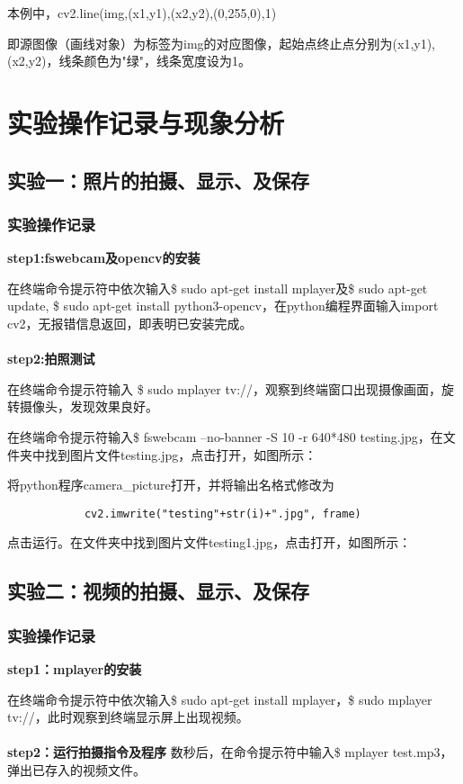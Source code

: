 \documentclass{article}
\begin{document}
本例中，cv2.line(img,(x1,y1),(x2,y2),(0,255,0),1)

即源图像（画线对象）为标签为img的对应图像，起始点终止点分别为(x1,y1),(x2,y2)，线条颜色为"绿"，线条宽度设为1。

\section{实验操作记录与现象分析}
\subsection{实验一：照片的拍摄、显示、及保存}
\subsubsection{实验操作记录}


\textbf{step1:fswebcam及opencv的安装}

在终端命令提示符中依次输入\$ sudo apt-get install mplayer及\$ sudo apt-get update,
\$ sudo apt-get install python3-opencv，在python编程界面输入import cv2，无报错信息返回，即表明已安装完成。
\\ \hspace*{\fill} \\ 
\indent\textbf{step2:拍照测试}

在终端命令提示符输入 \$ sudo mplayer tv://，观察到终端窗口出现摄像画面，旋转摄像头，发现效果良好。

在终端命令提示符输入\$ fswebcam --no-banner -S 10 -r 640*480 testing.jpg，在文件夹中找到图片文件testing.jpg，点击打开，如图所示：



将python程序camera\_picture打开，并将输出名格式修改为
\begin{lstlisting}
            cv2.imwrite("testing"+str(i)+".jpg", frame)
\end{lstlisting}

点击运行。在文件夹中找到图片文件testing1.jpg，点击打开，如图所示：


\subsection{实验二：视频的拍摄、显示、及保存}
\subsubsection{实验操作记录}
\indent\textbf{step1：mplayer的安装}

在终端命令提示符中依次输入\$ sudo apt-get install mplayer，\$ sudo mplayer tv://，此时观察到终端显示屏上出现视频。
\\ \hspace*{\fill}\\
\indent\textbf{step2：运行拍摄指令及程序}
数秒后，在命令提示符中输入\$ mplayer test.mp3，弹出已存入的视频文件。
\end{document}
